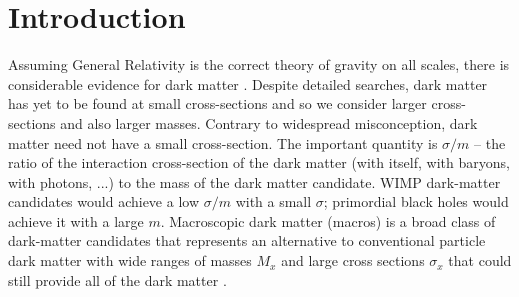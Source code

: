 \documentclass[%
 reprint,
 amsmath,amssymb,
 aps,
]{revtex4-2}
\newcommand{\vtwo}[1]{{\color{black} #1}}
\newcommand{\vthree}[1]{{\color{black} #1}}
\begin{document}
\maketitle


\section{Introduction} %
\label{sec:introduction}

    Assuming General Relativity is the correct theory of gravity on all scales, there is considerable evidence for dark matter \vtwo{\citep{Tanabashi2018}}. \vtwo{Despite detailed searches, dark matter has yet to be found at small cross-sections and so we consider larger cross-sections and also larger masses.}
   \vthree{Contrary to widespread misconception, dark matter need not have a small cross-section.  The important quantity is $\sigma/m$ -- the ratio of the interaction cross-section of the dark matter (with itself, with baryons, with photons, ...) to the mass of the dark matter candidate.  WIMP dark-matter candidates would achieve a low $\sigma/m$ with a small $\sigma$; primordial black holes would achieve it with a large $m$.}
    Macroscopic dark matter (macros) is a broad class of dark-matter candidates that represents an alternative to conventional particle dark matter with wide ranges of masses $M_x$ and \vthree{large} cross sections $\sigma_x$ that could still provide all of the dark matter \vtwo{\citep{jacobs2015macro}}.
\end{document}
